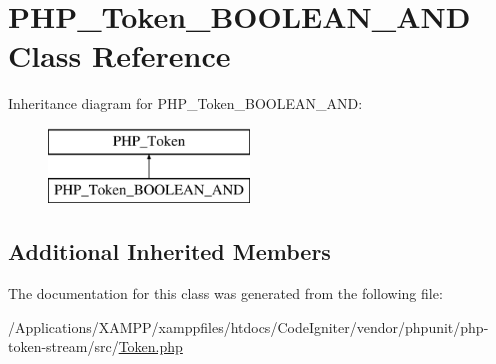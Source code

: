 \hypertarget{class_p_h_p___token___b_o_o_l_e_a_n___a_n_d}{}\section{P\+H\+P\+\_\+\+Token\+\_\+\+B\+O\+O\+L\+E\+A\+N\+\_\+\+A\+ND Class Reference}
\label{class_p_h_p___token___b_o_o_l_e_a_n___a_n_d}
Inheritance diagram for P\+H\+P\+\_\+\+Token\+\_\+\+B\+O\+O\+L\+E\+A\+N\+\_\+\+A\+ND\+:\begin{figure}[H]
\begin{center}
\leavevmode
\includegraphics[height=2.000000cm]{class_p_h_p___token___b_o_o_l_e_a_n___a_n_d}
\end{center}
\end{figure}
\subsection*{Additional Inherited Members}


The documentation for this class was generated from the following file\+:\begin{DoxyCompactItemize}
\item 
/\+Applications/\+X\+A\+M\+P\+P/xamppfiles/htdocs/\+Code\+Igniter/vendor/phpunit/php-\/token-\/stream/src/\mbox{\hyperlink{_token_8php}{Token.\+php}}\end{DoxyCompactItemize}

